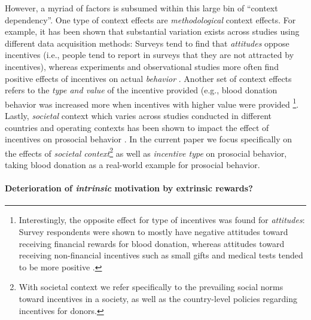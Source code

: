 \documentclass[AER]{AEA}
\begin{document}
However, a myriad of factors is subsumed within this large bin of “context dependency”. One type of context effects are \textit{methodological} context effects. For example, it has been shown that substantial variation exists across studies using different data acquisition methods: Surveys tend to find that \textit{attitudes} oppose incentives (i.e., people tend to report in surveys that they are not attracted by incentives), whereas experiments and observational studies more often find positive effects of incentives on actual \textit{behavior} \cite[i.e., the amount of prosocial behavior tends to be positively affected by incentives; ][]{chell_systematic_2018}. Another set of context effects refers to the \textit{type and value} of the incentive provided (e.g., blood donation behavior was increased more when incentives with higher value were provided \citep{lacetera_economic_2013} \footnote{Interestingly, the opposite effect for type of incentives was found for \textit{attitudes}: Survey respondents were shown to mostly have negative attitudes toward receiving financial rewards for blood donation, whereas attitudes toward receiving non-financial incentives such as small gifts and medical tests tended to be more positive \citep{lacetera_economic_2013}.}. Lastly, \textit{societal} context which varies across studies conducted in different countries and operating contexts has been shown to impact the effect of incentives on prosocial behavior \citep{chell_systematic_2018}. In the current paper we focus specifically on the effects of \textit{societal context}\footnote{With societal context we refer specifically to the prevailing social norms toward incentives in a society, as well as the country-level policies regarding incentives for donors.} as well as \textit{incentive type} on prosocial behavior, taking blood donation as a real-world example for prosocial behavior. 

\paragraph{Deterioration of \textit{intrinsic} motivation by extrinsic rewards?}
\end{document}
